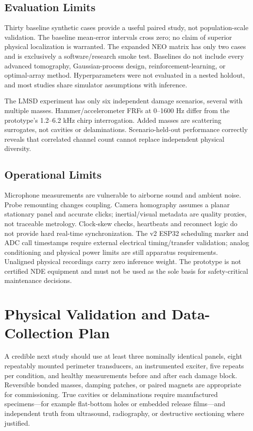 \documentclass[conference]{IEEEtran}
\begin{document}
\subsection{Evaluation Limits}
Thirty baseline synthetic cases provide a useful paired study, not population-scale validation. The baseline mean-error intervals cross zero; no claim of superior physical localization is warranted. The expanded NEO matrix has only two cases and is exclusively a software/research smoke test. Baselines do not include every advanced tomography, Gaussian-process design, reinforcement-learning, or optimal-array method. Hyperparameters were not evaluated in a nested holdout, and most studies share simulator assumptions with inference.

The LMSD experiment has only six independent damage scenarios, several with multiple masses. Hammer/accelerometer FRFs at 0--1600 Hz differ from the prototype's 1.2--6.2 kHz chirp interrogation. Added masses are scattering surrogates, not cavities or delaminations. Scenario-held-out performance correctly reveals that correlated channel count cannot replace independent physical diversity.

\subsection{Operational Limits}
Microphone measurements are vulnerable to airborne sound and ambient noise. Probe remounting changes coupling. Camera homography assumes a planar stationary panel and accurate clicks; inertial/visual metadata are quality proxies, not traceable metrology. Clock-skew checks, heartbeats and reconnect logic do not provide hard real-time synchronization. The v2 ESP32 scheduling marker and ADC call timestamps require external electrical timing/transfer validation; analog conditioning and physical power limits are still apparatus requirements. Unaligned physical recordings carry zero inference weight. The prototype is not certified NDE equipment and must not be used as the sole basis for safety-critical maintenance decisions.

\section{Physical Validation and Data-Collection Plan}
\label{sec:physical-validation}
A credible next study should use at least three nominally identical panels, eight repeatably mounted perimeter transducers, an instrumented exciter, five repeats per condition, and healthy measurements before and after each damage block. Reversible bonded masses, damping patches, or paired magnets are appropriate for commissioning. True cavities or delaminations require manufactured specimens---for example flat-bottom holes or embedded release films---and independent truth from ultrasound, radiography, or destructive sectioning where justified.
\end{document}
